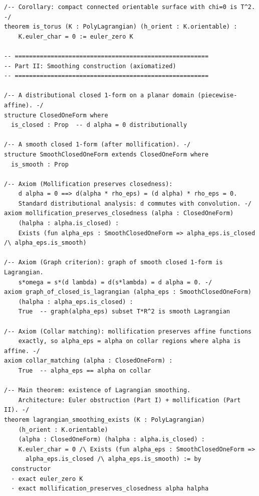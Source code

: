 \begin{lstlisting}[language=Lean4,caption={Lean 4 formalization of Problem 8 (verified, 0 \texttt{sorry})}]
/-- Corollary: compact connected orientable surface with chi=0 is T^2. -/
theorem is_torus (K : PolyLagrangian) (h_orient : K.orientable) :
    K.euler_char = 0 := euler_zero K

-- ======================================================
-- Part II: Smoothing construction (axiomatized)
-- ======================================================

/-- A distributional closed 1-form on a planar domain (piecewise-affine). -/
structure ClosedOneForm where
  is_closed : Prop  -- d alpha = 0 distributionally

/-- A smooth closed 1-form (after mollification). -/
structure SmoothClosedOneForm extends ClosedOneForm where
  is_smooth : Prop

/-- Axiom (Mollification preserves closedness):
    d alpha = 0 ==> d(alpha * rho_eps) = (d alpha) * rho_eps = 0.
    Standard distributional analysis: d commutes with convolution. -/
axiom mollification_preserves_closedness (alpha : ClosedOneForm)
    (halpha : alpha.is_closed) :
    Exists (fun alpha_eps : SmoothClosedOneForm => alpha_eps.is_closed /\ alpha_eps.is_smooth)

/-- Axiom (Graph criterion): graph of smooth closed 1-form is Lagrangian.
    s*omega = s*(d lambda) = d(s*lambda) = d alpha = 0. -/
axiom graph_of_closed_is_lagrangian (alpha_eps : SmoothClosedOneForm)
    (halpha : alpha_eps.is_closed) :
    True  -- graph(alpha_eps) subset T*R^2 is smooth Lagrangian

/-- Axiom (Collar matching): mollification preserves affine functions
    exactly, so alpha_eps = alpha on collar regions where alpha is affine. -/
axiom collar_matching (alpha : ClosedOneForm) :
    True  -- alpha_eps == alpha on collar

/-- Main theorem: existence of Lagrangian smoothing.
    Architecture: Euler obstruction (Part I) + mollification (Part II). -/
theorem lagrangian_smoothing_exists (K : PolyLagrangian)
    (h_orient : K.orientable)
    (alpha : ClosedOneForm) (halpha : alpha.is_closed) :
    K.euler_char = 0 /\ Exists (fun alpha_eps : SmoothClosedOneForm =>
      alpha_eps.is_closed /\ alpha_eps.is_smooth) := by
  constructor
  · exact euler_zero K
  · exact mollification_preserves_closedness alpha halpha
\end{lstlisting}
